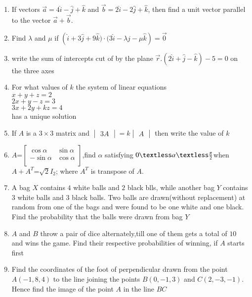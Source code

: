 \documentclass[12pt,-letter paper]{article}
\providecommand{\mydet}[1]{\ensuremath{\begin{vmatrix}#1\end{vmatrix}}}
\providecommand{\myvec}[1]{\ensuremath{\begin{bmatrix}#1\end{bmatrix}}}
\providecommand{\brak}[1]{\ensuremath{\left(#1\right)}}
\begin{document}
\begin{enumerate}
	\item If vectors $\overset{\rightarrow}{a} = 4\hat{i} - \hat{j} + \hat{k}$ and $\overset{\rightarrow}{b} = 2\hat{i} - 2\hat{j} + \hat{k}$, then find a unit vector parallel to the vector $\overset{\rightarrow}{a} + \overset{\rightarrow}{b}$.

 \item Find $\lambda$ and $\mu$ if $\brak{\hat{i} +3\hat{j} + 9\hat{k}) \cdot (3\hat{i} - \lambda \hat{j} - \mu \hat{k}} =\overset\rightarrow 0$
  

 \item  write the sum of intercepts cut of by the plane $\overset{\rightarrow}{r}. \brak{2\hat{i}+\hat{j}-\hat{k}}-5=0$ on the three axes



\item For what values of $k$ the system of linear equations\\
$x+y+z=2$\\
$2x+y-z=3$\\
$3x+2y+kz=4$\\
has a unique solution

\item If $A$ is a $3\times3$ matrix and $\mydet{3A}=k\mydet{A}$ then     write the value of $k$


 \item $A$=$\myvec{\cos\alpha&\sin\alpha\\                           -\sin\alpha&\cos\alpha\\}$,find $\alpha$ satisfying $0\textless\alpha\textless\frac{\pi}{2}$when $A+A^T$=$\sqrt{2}$$I_{2}$; where $A^T$ is     transpose of $A$.

	\item A bag $X$ contains $4$ white balls and $2$ black blls, while another bag $Y$ contains $3$ white balls and $3$ black balls. Two balls are drawn(without replacement) at random from one of the bags and were found to be one white and one black. Find the probability that the balls were drawn from bag $Y$
	
	\item $A$ and $B$ throw a pair of dice alternately,till one of them gets a total of $10$ and wins the game. Find their respective probabilities of winning, if $A$ starts first		


	\item Find the coordinates of the foot of perpendicular drawn from the point $A\brak{-1,8,4}$ to the line joining the points $B\brak{0,-1,3}$ and $C\brak{2,-3,-1}$. Hence find the image of the point $A$ in the line $BC$




\end{enumerate}
\end{document}
